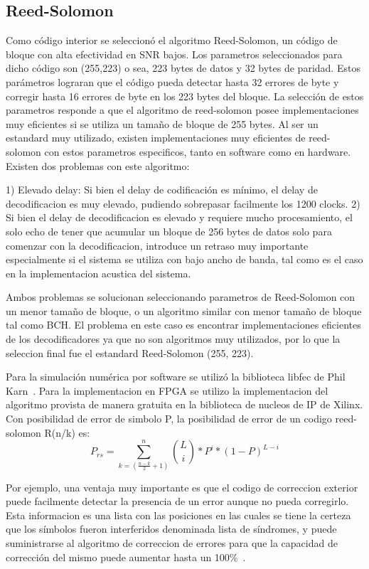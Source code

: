 \subsection{Reed-Solomon}
Como código interior se seleccionó el algoritmo Reed-Solomon, un código de bloque con alta efectividad en SNR bajos. Los parametros seleccionados para dicho código son (255,223) o sea, 223 bytes de datos y 32 bytes de paridad. Estos parámetros lograran que el código pueda detectar hasta 32 errores de byte y corregir hasta 16 errores de byte en los 223 bytes del bloque. La selección de estos parametros responde a que el algoritmo de reed-solomon posee implementaciones muy eficientes si se utiliza un tamaño de bloque de 255 bytes. 
Al ser un estandard muy utilizado, existen implementaciones muy eficientes de reed-solomon con estos parametros especificos, tanto en software como en hardware.
Existen dos problemas con este algoritmo:

1) Elevado delay: Si bien el delay de codificación es mínimo, el delay de decodificacion es muy elevado, pudiendo sobrepasar facilmente los 1200 clocks.
2) Si bien el delay de decodificacion es elevado y requiere mucho procesamiento, el solo echo de tener que acumular un bloque de 256 bytes de datos solo para comenzar con la decodificacion, introduce un retraso muy importante especialmente si el sistema se utiliza con bajo ancho de banda, tal como es el caso en la implementacion acustica del sistema.

Ambos problemas se solucionan seleccionando parametros de Reed-Solomon con un menor tamaño de bloque, o un algoritmo similar con menor tamaño de bloque tal como BCH. El problema en este caso es encontrar implementaciones eficientes de los decodificadores ya que no son algoritmos muy utilizados, por lo que la seleccion final fue el estandard Reed-Solomon (255, 223).

Para la simulación numérica por software se utilizó la biblioteca libfec de Phil Karn~\cite{libfec}. Para la implementacion en FPGA se utilizo la implementacion del algoritmo provista de manera gratuita en la biblioteca de nucleos de IP de Xilinx.
Con posibilidad de error de simbolo P, la posibilidad de error de un codigo reed-solomon R(n/k) es:
$$P_{rs}= \sum_{k=(\frac{n-k}{2}+1)}^{n} \binom{L}{i} * P^{i} * (1-P)^{L-i} $$

Por ejemplo, una ventaja muy importante es que el codigo de correccion exterior puede facilmente detectar la presencia de un error aunque no pueda corregirlo. Esta informacion es una lista con las posiciones en las cuales se tiene la certeza que los símbolos fueron interferidos denominada lista de síndromes, y puede suministrarse al algoritmo de correccion de errores para que la capacidad de corrección del mismo puede aumentar hasta un 100\%~\cite{Moon:05}.

